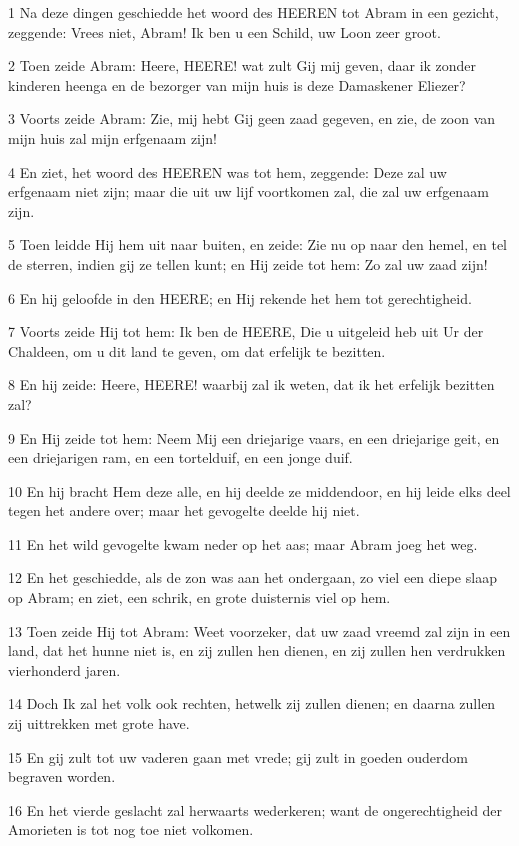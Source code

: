 \par 1 Na deze dingen geschiedde het woord des HEEREN tot Abram in een gezicht, zeggende: Vrees niet, Abram! Ik ben u een Schild, uw Loon zeer groot.
\par 2 Toen zeide Abram: Heere, HEERE! wat zult Gij mij geven, daar ik zonder kinderen heenga en de bezorger van mijn huis is deze Damaskener Eliezer?
\par 3 Voorts zeide Abram: Zie, mij hebt Gij geen zaad gegeven, en zie, de zoon van mijn huis zal mijn erfgenaam zijn!
\par 4 En ziet, het woord des HEEREN was tot hem, zeggende: Deze zal uw erfgenaam niet zijn; maar die uit uw lijf voortkomen zal, die zal uw erfgenaam zijn.
\par 5 Toen leidde Hij hem uit naar buiten, en zeide: Zie nu op naar den hemel, en tel de sterren, indien gij ze tellen kunt; en Hij zeide tot hem: Zo zal uw zaad zijn!
\par 6 En hij geloofde in den HEERE; en Hij rekende het hem tot gerechtigheid.
\par 7 Voorts zeide Hij tot hem: Ik ben de HEERE, Die u uitgeleid heb uit Ur der Chaldeen, om u dit land te geven, om dat erfelijk te bezitten.
\par 8 En hij zeide: Heere, HEERE! waarbij zal ik weten, dat ik het erfelijk bezitten zal?
\par 9 En Hij zeide tot hem: Neem Mij een driejarige vaars, en een driejarige geit, en een driejarigen ram, en een tortelduif, en een jonge duif.
\par 10 En hij bracht Hem deze alle, en hij deelde ze middendoor, en hij leide elks deel tegen het andere over; maar het gevogelte deelde hij niet.
\par 11 En het wild gevogelte kwam neder op het aas; maar Abram joeg het weg.
\par 12 En het geschiedde, als de zon was aan het ondergaan, zo viel een diepe slaap op Abram; en ziet, een schrik, en grote duisternis viel op hem.
\par 13 Toen zeide Hij tot Abram: Weet voorzeker, dat uw zaad vreemd zal zijn in een land, dat het hunne niet is, en zij zullen hen dienen, en zij zullen hen verdrukken vierhonderd jaren.
\par 14 Doch Ik zal het volk ook rechten, hetwelk zij zullen dienen; en daarna zullen zij uittrekken met grote have.
\par 15 En gij zult tot uw vaderen gaan met vrede; gij zult in goeden ouderdom begraven worden.
\par 16 En het vierde geslacht zal herwaarts wederkeren; want de ongerechtigheid der Amorieten is tot nog toe niet volkomen.
